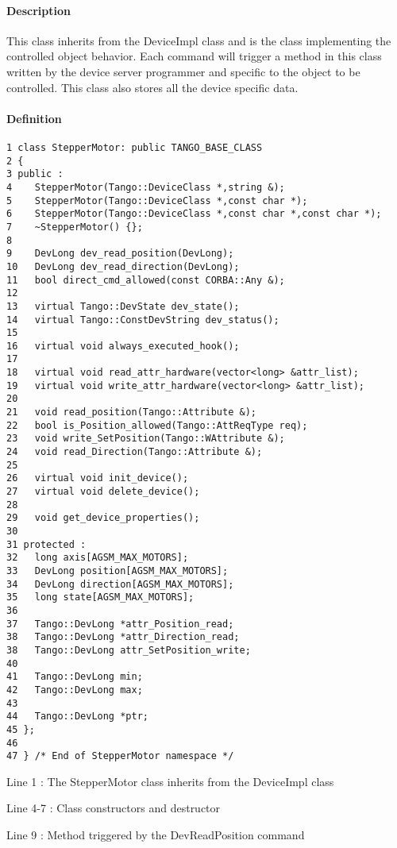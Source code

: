 \paragraph{Description}

This class inherits from the DeviceImpl class and
is the class implementing the controlled object behavior. Each command
will trigger a method in this class written by the device server programmer
and specific to the object to be controlled. This class also stores
all the device specific data.


\paragraph{Definition}


\begin{verbatim}
1 class StepperMotor: public TANGO_BASE_CLASS
2 {
3 public :
4    StepperMotor(Tango::DeviceClass *,string &);
5    StepperMotor(Tango::DeviceClass *,const char *);
6    StepperMotor(Tango::DeviceClass *,const char *,const char *);
7    ~StepperMotor() {};
8 
9    DevLong dev_read_position(DevLong);
10   DevLong dev_read_direction(DevLong);
11   bool direct_cmd_allowed(const CORBA::Any &);
12 
13   virtual Tango::DevState dev_state();
14   virtual Tango::ConstDevString dev_status();
15 
16   virtual void always_executed_hook();
17 
18   virtual void read_attr_hardware(vector<long> &attr_list);
19   virtual void write_attr_hardware(vector<long> &attr_list);
20 
21   void read_position(Tango::Attribute &);
22   bool is_Position_allowed(Tango::AttReqType req);
23   void write_SetPosition(Tango::WAttribute &);
24   void read_Direction(Tango::Attribute &);
25 
26   virtual void init_device();
27   virtual void delete_device();
28 
29   void get_device_properties();
30 
31 protected : 
32   long axis[AGSM_MAX_MOTORS];
33   DevLong position[AGSM_MAX_MOTORS];
34   DevLong direction[AGSM_MAX_MOTORS];
35   long state[AGSM_MAX_MOTORS];
36 
37   Tango::DevLong *attr_Position_read;
38   Tango::DevLong *attr_Direction_read;
38   Tango::DevLong attr_SetPosition_write;
40 
41   Tango::DevLong min;
42   Tango::DevLong max;
43 
44   Tango::DevLong *ptr;
45 };
46 
47 } /* End of StepperMotor namespace */
\end{verbatim}


Line 1 : The StepperMotor class inherits from the DeviceImpl class

Line 4-7 : Class constructors and destructor

Line 9 : Method triggered by the DevReadPosition command

